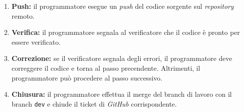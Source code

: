 \begin{itemize}
\begin{enumerate}
		      \item \textbf{Push:} il programmatore esegue un \textit{push}
		            del codice sorgente sul \textit{repository} remoto.

		      \item \textbf{Verifica:} il programmatore segnala al
		            verificatore che il codice è pronto per essere verificato.

		      \item \textbf{Correzione:} se il verificatore segnala degli
		            errori, il programmatore deve correggere il codice e torna
		            al passo precendente. Altrimenti, il programmatore può
		            procedere al passo successivo.

		      \item \textbf{Chiusura:} il programmatore effettua il merge del
		            branch di lavoro con il branch \texttt{dev} e chiude il
		            ticket di \textit{GitHub} corrispondente.
	      \end{enumerate}
\end{itemize}
